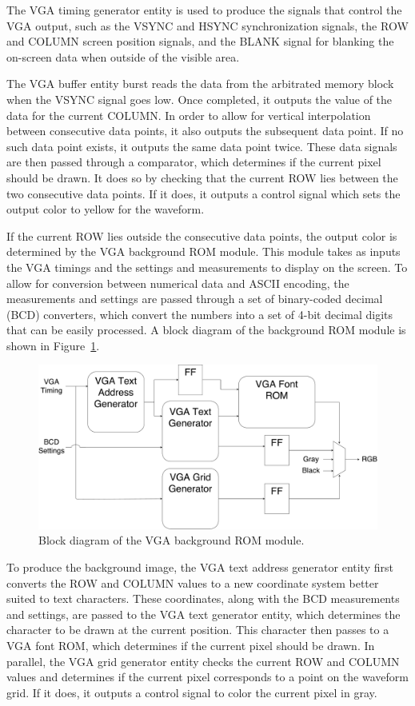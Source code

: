 \documentclass[journal]{IEEEtran}
\begin{document}
The VGA timing generator entity is used to produce the signals that control the VGA output, such as the VSYNC and HSYNC synchronization signals, the ROW and COLUMN screen position signals, and the BLANK signal for blanking the on-screen data when outside of the visible area.

The VGA buffer entity burst reads the data from the arbitrated memory block when the VSYNC signal goes low. Once completed, it outputs the value of the data for the current COLUMN. In order to allow for vertical interpolation between consecutive data points, it also outputs the subsequent data point. If no such data point exists, it outputs the same data point twice.
These data signals are then passed through a comparator, which determines if the current pixel should be drawn. It does so by checking that the current ROW lies between the two consecutive data points. If it does, it outputs a control signal which sets the output color to yellow for the waveform.

If the current ROW lies outside the consecutive data points, the output color is determined by the VGA background ROM module. This module takes as inputs the VGA timings and the settings and measurements to display on the screen. To allow for conversion between numerical data and ASCII encoding, the measurements and settings are passed through a set of binary-coded decimal (BCD) converters, which convert the numbers into a set of 4-bit decimal digits that can be easily processed. A block diagram of the background ROM module is shown in Figure~\ref{fig:vga_rom}.

\begin{figure}[!htb]
  \centering
  \includegraphics[width=\columnwidth]{diagrams/vga_rom.pdf}
  \caption{Block diagram of the VGA background ROM module.}
  \label{fig:vga_rom}
\end{figure}

To produce the background image, the VGA text address generator entity first converts the ROW and COLUMN values to a new coordinate system better suited to text characters. These coordinates, along with the BCD measurements and settings, are passed to the VGA text generator entity, which determines the character to be drawn at the current position. This character then passes to a VGA font ROM, which determines if the current pixel should be drawn.
In parallel, the VGA grid generator entity checks the current ROW and COLUMN values and determines if the current pixel corresponds to a point on the waveform grid. If it does, it outputs a control signal to color the current pixel in gray.
\end{document}
